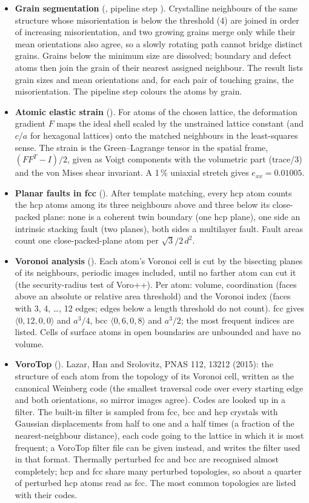 \begin{itemize}
\item \textbf{Grain segmentation} (, pipeline step ). Crystalline neighbours of the same structure whose misorientation is below the threshold (4\textdegree) are joined in order of increasing misorientation, and two growing grains merge only while their mean orientations also agree, so a slowly rotating path cannot bridge distinct grains. Grains below the minimum size are dissolved; boundary and defect atoms then join the grain of their nearest assigned neighbour. The result lists grain sizes and mean orientations and, for each pair of touching grains, the misorientation. The pipeline step colours the atoms by grain.
\item \textbf{Atomic elastic strain} (). For atoms of the chosen lattice, the deformation gradient $F$ maps the ideal shell scaled by the unstrained lattice constant (and $c/a$ for hexagonal lattices) onto the matched neighbours in the least-squares sense. The strain is the Green--Lagrange tensor in the spatial frame, $(FF^{T}-I)/2$, given as Voigt components with the volumetric part (trace/3) and the von Mises shear invariant. A 1\,\% uniaxial stretch gives $e_{xx}=0.01005$.
\item \textbf{Planar faults in fcc} (). After template matching, every hcp atom counts the hcp atoms among its three neighbours above and three below its close-packed plane: none is a coherent twin boundary (one hcp plane), one side an intrinsic stacking fault (two planes), both sides a multilayer fault. Fault areas count one close-packed-plane atom per $\sqrt3/2\,d^2$.
\item \textbf{Voronoi analysis} (). Each atom's Voronoi cell is cut by the bisecting planes of its neighbours, periodic images included, until no farther atom can cut it (the security-radius test of Voro++). Per atom: volume, coordination (faces above an absolute or relative area threshold) and the Voronoi index (faces with 3, 4, \dots, 12 edges; edges below a length threshold do not count). fcc gives $\langle0,12,0,0\rangle$ and $a^3/4$, bcc $\langle0,6,0,8\rangle$ and $a^3/2$; the most frequent indices are listed. Cells of surface atoms in open boundaries are unbounded and have no volume.
\item \textbf{VoroTop} (). Lazar, Han and Srolovitz, PNAS 112, 13212 (2015): the structure of each atom from the topology of its Voronoi cell, written as the canonical Weinberg code (the smallest traversal code over every starting edge and both orientations, so mirror images agree). Codes are looked up in a filter. The built-in filter is sampled from fcc, bcc and hcp crystals with Gaussian displacements from half to one and a half times  (a fraction of the nearest-neighbour distance), each code going to the lattice in which it is most frequent; a VoroTop filter file can be given instead, and  writes the filter used in that format. Thermally perturbed fcc and bcc are recognised almost completely; hcp and fcc share many perturbed topologies, so about a quarter of perturbed hcp atoms read as fcc. The most common topologies are listed with their codes.

\end{itemize}
